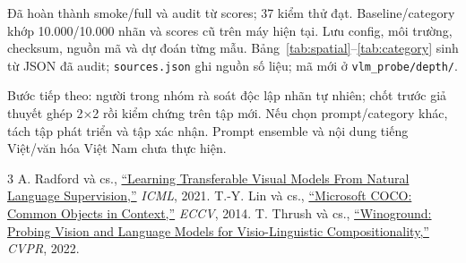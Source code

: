 \documentclass[11pt,a4paper]{article}
\begin{document}
Đã hoàn thành smoke/full và audit từ scores; 37 kiểm thử đạt. Baseline/category khớp 10.000/10.000 nhãn và scores cũ trên máy hiện tại. Lưu config, môi trường, checksum, nguồn mã và dự đoán từng mẫu. Bảng~\ref{tab:spatial}--\ref{tab:category} sinh từ JSON đã audit; \texttt{sources.json} ghi nguồn số liệu; mã mới ở \texttt{vlm\_probe/depth/}.

Bước tiếp theo: người trong nhóm rà soát độc lập nhãn tự nhiên; chốt trước giả thuyết ghép 2×2 rồi kiểm chứng trên tập mới. Nếu chọn prompt/category khác, tách tập phát triển và tập xác nhận. Prompt ensemble và nội dung tiếng Việt/văn hóa Việt Nam chưa thực hiện.

\begingroup\small
\begin{thebibliography}{3}
\setlength{\itemsep}{0pt}\setlength{\parskip}{0pt}
 A. Radford và cs., \href{https://proceedings.mlr.press/v139/radford21a.html}{``Learning Transferable Visual Models From Natural Language Supervision,''} \emph{ICML}, 2021.
 T.-Y. Lin và cs., \href{https://arxiv.org/abs/1405.0312}{``Microsoft COCO: Common Objects in Context,''} \emph{ECCV}, 2014.
 T. Thrush và cs., \href{https://arxiv.org/abs/2204.03162}{``Winoground: Probing Vision and Language Models for Visio-Linguistic Compositionality,''} \emph{CVPR}, 2022.
\end{thebibliography}\endgroup
\end{document}
